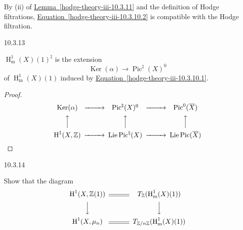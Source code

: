     By (ii) of \hyperref[hodge-theory-iii-10.3.11]{Lemma~\ref*{hodge-theory-iii-10.3.11}} and the definition of Hodge filtrations, \hyperref[hodge-theory-iii-10.3.10.2]{Equation~\ref*{hodge-theory-iii-10.3.10.2}} is compatible with the Hodge filtration.\begin{corollary}{10.3.13}\label{hodge-theory-iii-10.3.13}\skipsinglepar\par{}\(\operatorname {H}_\mathrm {m}^1(X)(1)^\natural \) is the extension
    \[       \operatorname {Ker}(\alpha )       \to  \operatorname {Pic}^\natural (X)^0     \]
    of \(\operatorname {H}_\mathrm {m}^1(X)(1)\) induced by \hyperref[hodge-theory-iii-10.3.10.1]{Equation~\ref*{hodge-theory-iii-10.3.10.1}}.\begin{proof}\[       \begin {CD}         \operatorname {Ker}(\alpha ) @>>> \operatorname {Pic}^\natural (X)^0 @>>> \operatorname {Pic}^0(\overline {X})       \\@AAA @AAA @AAA       \\\operatorname {H}^1(X,\mathbb {Z}) @>>> \operatorname {Lie}\operatorname {Pic}^\natural (X) @>>> \operatorname {Lie}\operatorname {Pic}(\overline {X})       \end {CD}     \qedhere\]\end{proof}\end{corollary}\begin{exercise}{10.3.14}\label{hodge-theory-iii-10.3.14}\skipsinglepar\par{}Show that the diagram
    \[       \begin {CD}         \operatorname {H}^1(X,\mathbb {Z}(1)) @= T_\mathbb {Z}(\operatorname {H}_\mathrm {m}^1(X)(1))       \\@VVV @VVV       \\\operatorname {H}^1(X,\mu _n) @= T_{\mathbb {Z}{/}n\mathbb {Z}}(\operatorname {H}_\mathrm {m}^1(X)(1))       \end {CD}     \]

\end{exercise}

